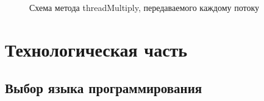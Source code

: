 \documentclass[a4paper,14pt]{report}
\begin{document}
\begin{figure}
\caption{Схема метода threadMultiply, передаваемого каждому потоку}
\label{fig:image}
\end{figure}

\chapter*{Технологическая часть}

\section*{Выбор языка программирования}
\end{document}
